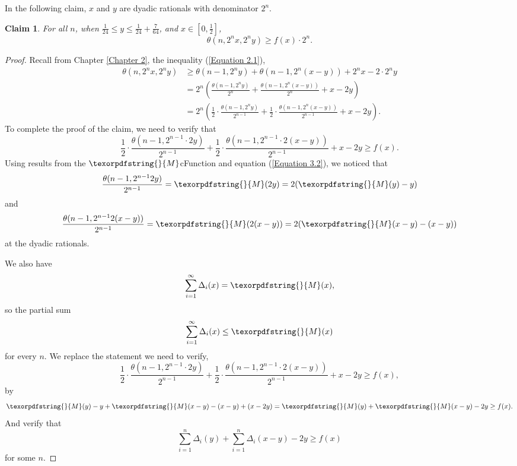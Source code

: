 \documentclass[12pt]{ucthesis}
\theoremstyle{plain}
\newtheorem{claim}{Claim}
\theoremstyle{definition}
\newcommand{\takagi}{
  \texorpdfstring{\protect}{M}
}
\begin{document}
In the following claim, $x$ and $y$ are dyadic rationals with denominator $2^n$.
\begin{claim}
\label{Claim 6}
For all $n$, when $\frac{1}{24} \le y \le \frac{1}{24} + \frac{7}{64}$,
and $x \in [0, \frac{1}{2}]$,
\begin{equation*}
\theta(n, 2^n x, 2^n y) \ge f(x) \cdot 2^n.
\end{equation*}
\end{claim}
\begin{proof}
Recall from Chapter \ref{Chapter 2}, the inequality (\ref{Equation 2.1}),
\begin{align*}
\theta(n, 2^n x, 2^n y)
& \ge \theta(n - 1, 2^n y) + \theta(n - 1, 2^n (x - y)) + 2^n x - 2 \cdot 2^n y \\
& = 2^n \left(\frac{\theta(n - 1, 2^n y)}{2^n} + \frac{\theta(n - 1, 2^n (x - y))}{2^n} + x - 2 y
	\right) \\
& = 2^n \left(\frac{1}{2} \cdot \frac{\theta(n - 1, 2^n y)}{2^{n - 1}} +
	      \frac{1}{2} \cdot \frac{\theta(n - 1, 2^n (x - y))}{2^{n - 1}} + x - 2 y
	\right).
\end{align*}
To complete the proof of the claim, we need to verify that
\begin{equation*}
\frac{1}{2} \cdot \frac{\theta(n - 1, 2^{n - 1} \cdot 2 y)}{2^{n - 1}} +
\frac{1}{2} \cdot \frac{\theta(n - 1, 2^{n - 1} \cdot 2 (x - y))}{2^{n - 1}} + x - 2 y \ge f(x).
\end{equation*}
Using results from the $\takagi$cFunction and equation (\ref{Equation 3.2}),
we noticed that
\begin{equation*}
\frac{\theta(n - 1, 2^{n - 1} 2 y)}{2^{n - 1}} = \takagi(2 y) = 2 (\takagi(y) - y)
\end{equation*}
and
\begin{equation*}
\frac{\theta(n - 1, 2^{n - 1} 2 (x - y))}{2^{n - 1}}
= \takagi(2 (x - y))
= 2 (\takagi(x - y) - (x - y))
\end{equation*}
at the dyadic rationals.

We also have
\begin{equation*}
\sum_{i = 1}^\infty \Delta_i(x) = \takagi(x),
\end{equation*}
so the partial sum
\begin{equation*}
\sum_{i = 1}^\infty \Delta_i(x) \le \takagi(x)
\end{equation*}
for every $n$.
We replace the statement we need to verify,
\begin{equation*}
\frac{1}{2} \cdot \frac{\theta(n - 1, 2^{n - 1} \cdot 2 y)}{2^{n - 1}} +
\frac{1}{2} \cdot \frac{\theta(n - 1, 2^{n - 1} \cdot 2 (x - y))}{2^{n - 1}} + x - 2 y \ge f(x),
\end{equation*}
by
\begin{equation*}
\takagi(y) - y + \takagi(x - y) - (x - y) + (x - 2 y)
= \takagi(y) + \takagi(x - y) - 2y
\ge f(x).
\end{equation*}
And verify that
\begin{equation}
\label{Equation 4.7}
\sum_{i = 1}^n \Delta_i(y) + \sum_{i = 1}^n \Delta_i(x - y) - 2 y \ge f(x)
\end{equation}
for some $n$.


\end{proof}
\end{document}
